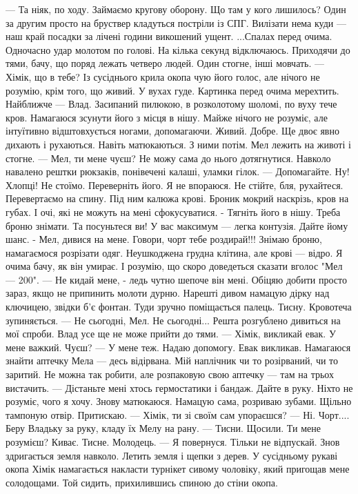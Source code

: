 — Та ніяк, по ходу. Займаємо кругову оборону. Що там у кого лишилось? 
Один за другим просто на бруствер кладуться постріли із СПГ.  Вилізати нема куди — наш край посадки за лічені години викошений ущент.
...Спалах перед очима. Одночасно удар молотом по голові. На кілька секунд відключаюсь. Приходячи до тями, бачу, що поряд лежать четверо людей. Один стогне, інші мовчать. 
— Хімік, що в тебе?
Із сусіднього крила окопа чую його голос, але нічого не розумію, крім того, що живий. У вухах гуде. Картинка перед очима мерехтить. 
Найближче  —     Влад. Засипаний пилюкою, в розколотому шоломі, по вуху тече кров. Намагаюся зсунути його з місця в нішу. Майже нічого не розуміє, але інтуїтивно відштовхується ногами, допомагаючи. Живий. Добре.
Ще двоє явно дихають і рухаються. Навіть матюкаються. З ними потім. Мел лежить на животі і стогне. 
— Мел, ти мене чуєш? 
Не можу сама до нього дотягнутися. Навколо навалено рештки рюкзаків, понівечені калаші, уламки гілок. 
— Допомагайте. Ну! Хлопці! Не стоїмо. Переверніть його. Я не впораюся. Не стійте, бля, рухайтеся. 
Перевертаємо на спину. Під ним калюжа крові. Броник мокрий наскрізь, кров на губах. І очі, які не можуть на мені сфокусуватися. 
- Тягніть  його в нішу. Треба броню знімати. Та посуньтеся ви! У вас максимум — легка контузія. Дайте йому шанс. 
- Мел, дивися на мене. Говори, чорт тебе роздирай!!!
Знімаю броню, намагаємося розрізати одяг. Неушкоджена грудна клітина, але крові — відро. Я очима бачу, як він умирає. І розумію, що скоро доведеться сказати вголос "Мел — 200".  
— Не кидай мене,  - ледь чутно шепоче він мені. 
Обіцяю добити просто зараз, якщо не припинить молоти дурню. 
Нарешті дивом намацую дірку над ключицею, звідки б'є фонтан. Туди зручно поміщається палець. Тисну. Кровотеча зупиняється. 
— Не сьогодні,  Мел. Не сьогодні...
Решта розгублено дивиться на мої спроби.  Влад усе ще не може прийти до тями. 
— Хімік, викликай евак. У мене важкий. Чуєш? 
— У мене теж. Надаю допомогу. Евак  викликав. 
Намагаюся знайти аптечку Мела — десь відірвана. Мій наплічник чи то розірваний, чи то заритий. Не можна так робити, але розпаковую свою аптечку — там на трьох вистачить. 
— Дістаньте мені хтось гермостатики і бандаж. Дайте в руку. 
Ніхто не розуміє, чого я хочу. Знову матюкаюся. Намацую сама, розриваю зубами. Щільно тампоную отвір. Притискаю. 
— Хімік, ти зі своїм сам упораєшся? 
— Ні. 
Чорт.... Беру Владьку за руку, кладу їх Мелу на рану. 
— Тисни. Щосили. Ти мене розумієш? 
Киває. Тисне. Молодець. 
— Я повернуся. Тільки не відпускай.
Знов здригається земля навколо. Летить земля і щепки з дерев. 
У сусідньому рукаві окопа Хімік намагається накласти турнікет сивому чоловіку, який пригощав мене солодощами. Той сидить,  прихилившись спиною до стіни окопа.  
